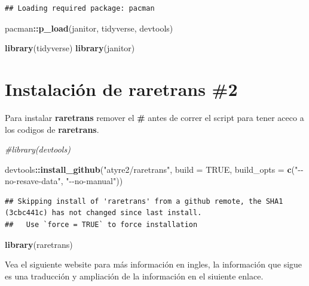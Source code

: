\documentclass[
]{book}
\newenvironment{Shaded}{\begin{snugshade}}{\end{snugshade}}
\newcommand{\AttributeTok}[1]{\textcolor[rgb]{0.13,0.29,0.53}{#1}}
\newcommand{\CommentTok}[1]{\textcolor[rgb]{0.56,0.35,0.01}{\textit{#1}}}
\newcommand{\ConstantTok}[1]{\textcolor[rgb]{0.56,0.35,0.01}{#1}}
\newcommand{\FunctionTok}[1]{\textcolor[rgb]{0.13,0.29,0.53}{\textbf{#1}}}
\newcommand{\NormalTok}[1]{#1}
\newcommand{\SpecialCharTok}[1]{\textcolor[rgb]{0.81,0.36,0.00}{\textbf{#1}}}
\newcommand{\StringTok}[1]{\textcolor[rgb]{0.31,0.60,0.02}{#1}}
\theoremstyle{definition}
\theoremstyle{definition}
\theoremstyle{definition}
\theoremstyle{definition}
\theoremstyle{remark}
\begin{document}
\begin{verbatim}
## Loading required package: pacman
\end{verbatim}

\begin{Shaded}
\begin{Highlighting}[]
\NormalTok{pacman}\SpecialCharTok{::}\FunctionTok{p\_load}\NormalTok{(janitor, tidyverse, devtools)}

\FunctionTok{library}\NormalTok{(tidyverse)}
\FunctionTok{library}\NormalTok{(janitor)}
\end{Highlighting}
\end{Shaded}

\section{Instalación de raretrans \#2}\label{instalaciuxf3n-de-raretrans-2}

Para instalar \textbf{raretrans} remover el \textbf{\#} antes de correr el script para tener aceco a los codigos de \textbf{raretrans}.

\begin{Shaded}
\begin{Highlighting}[]
\CommentTok{\#library(devtools)}

\NormalTok{devtools}\SpecialCharTok{::}\FunctionTok{install\_github}\NormalTok{(}\StringTok{"atyre2/raretrans"}\NormalTok{, }\AttributeTok{build =} \ConstantTok{TRUE}\NormalTok{, }\AttributeTok{build\_opts =} \FunctionTok{c}\NormalTok{(}\StringTok{"{-}{-}no{-}resave{-}data"}\NormalTok{, }\StringTok{"{-}{-}no{-}manual"}\NormalTok{))}
\end{Highlighting}
\end{Shaded}

\begin{verbatim}
## Skipping install of 'raretrans' from a github remote, the SHA1 (3cbc441c) has not changed since last install.
##   Use `force = TRUE` to force installation
\end{verbatim}

\begin{Shaded}
\begin{Highlighting}[]
\FunctionTok{library}\NormalTok{(raretrans)}
\end{Highlighting}
\end{Shaded}

Vea el siguiente website para más información en ingles, la información que sigue es una traducción y ampliación de la información en el siuiente enlace.
\end{document}
